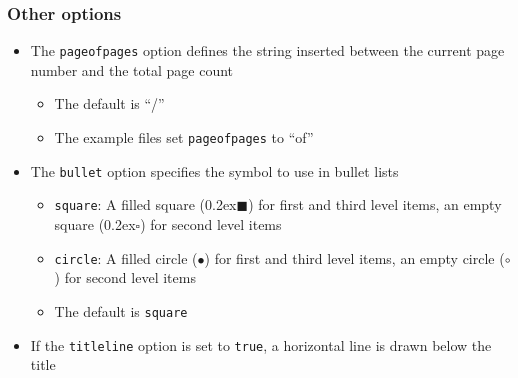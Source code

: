 \begin{frame}[t,fragile]
\frametitle{Other options}
\begin{itemize}
\item The \verb!pageofpages! option defines the string inserted between the current page number
      and the total page count
  \begin{itemize}
  \item The default is ``/''
  \item The example files set \verb!pageofpages! to ``of''
  \end{itemize}
\item The \verb!bullet! option specifies the symbol to use in bullet lists
  \begin{itemize}
  \item \verb!square!: A filled square
       ({\tiny\raise0.2ex\hbox{$\blacksquare$}}) for first and third level
        items, an empty square ({\tiny\raise0.2ex\hbox{$\square$}}) for
        second level items
  \item \verb!circle!: A filled circle ({$\bullet$}) for first
        and third level items, an empty circle ({$\circ$}) for second
        level items
  \item The default is \verb!square!
  \end{itemize}
\item If the \verb!titleline! option is set to \verb!true!, a horizontal line is drawn below
      the title
\end{itemize}
\end{frame}
